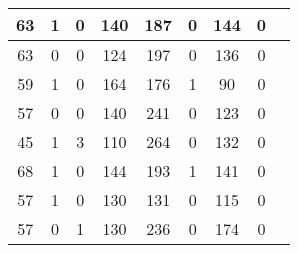 \documentclass{article}
\begin{document}
\begin{longtable}{
|
c|c|c|c|c|c|c|c|c|}
\hline
63 & 1 & 0 & 140 & 187 & 0 & 144 & 0 \\
\hline
63 & 0 & 0 & 124 & 197 & 0 & 136 & 0 \\
\hline
59 & 1 & 0 & 164 & 176 & 1 & 90 & 0 \\
\hline
57 & 0 & 0 & 140 & 241 & 0 & 123 & 0 \\
\hline
45 & 1 & 3 & 110 & 264 & 0 & 132 & 0 \\
\hline
68 & 1 & 0 & 144 & 193 & 1 & 141 & 0 \\
\hline
57 & 1 & 0 & 130 & 131 & 0 & 115 & 0 \\
\hline
57 & 0 & 1 & 130 & 236 & 0 & 174 & 0 \\
\hline
\end{longtable}
\end{document}
